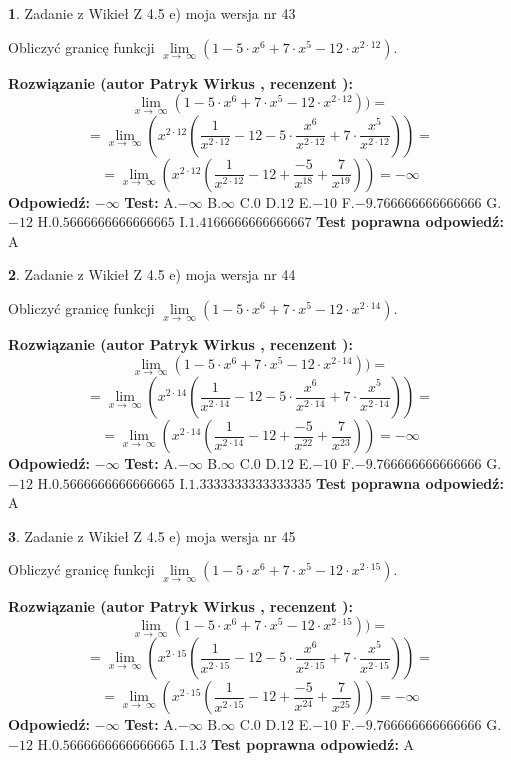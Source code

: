 \documentclass[12pt, a4paper]{article}
\theoremstyle{definition} %
\newtheorem{zad}{}
\newcommand{\zadStart}[1]{\begin{zad}#1\newline}
\newcommand{\zadStop}{\end{zad}}
\newcommand{\rozwStart}[2]{\noindent \textbf{Rozwiązanie (autor #1 , recenzent #2): }\newline}
\newcommand{\rozwStop}{\newline}
\newcommand{\odpStart}{\noindent \textbf{Odpowiedź:}\newline}
\newcommand{\odpStop}{\newline}
\newcommand{\testStart}{\noindent \textbf{Test:}\newline}
\newcommand{\testStop}{\newline}
\newcommand{\kluczStart}{\noindent \textbf{Test poprawna odpowiedź:}\newline}
\newcommand{\kluczStop}{\newline}
\begin{document}
\zadStart{Zadanie z Wikieł Z 4.5 e) moja wersja nr 43}


Obliczyć granicę funkcji  $\lim\limits_{x\to\ \infty}(1 - 5 \cdot x^{6}+7 \cdot x^{5}- 12 \cdot x^{2\cdot12})$.
\zadStop
\rozwStart{Patryk Wirkus}{}
$$\lim\limits_{x\to\ \infty}(1 - 5 \cdot x^{6}+7 \cdot x^{5}- 12 \cdot x^{2\cdot12}))=$$
$$=\lim\limits_{x\to\ \infty}(x^{2\cdot12}(\frac{1}{x^{2\cdot12}}-12 -5 \cdot \frac{x^{6}}{x^{2\cdot12}}+7 \cdot \frac{x^{5}}{x^{2\cdot12}}))=$$
$$=\lim\limits_{x\to\ \infty}(x^{2\cdot12}(\frac{1}{x^{2\cdot12}}-12 + \frac{-5}{x^{18}}+ \frac{7}{x^{19}}))=-\infty$$
\rozwStop
\odpStart
$-\infty$
\odpStop
\testStart
A.$-\infty$ B.$\infty$ C.$0$ D.$12$ E.$-10$
F.$-9.766666666666666$ G.$-12$
H.$0.5666666666666665$
I.$1.4166666666666667$
\testStop
\kluczStart
A
\kluczStop



\zadStart{Zadanie z Wikieł Z 4.5 e) moja wersja nr 44}


Obliczyć granicę funkcji  $\lim\limits_{x\to\ \infty}(1 - 5 \cdot x^{6}+7 \cdot x^{5}- 12 \cdot x^{2\cdot14})$.
\zadStop
\rozwStart{Patryk Wirkus}{}
$$\lim\limits_{x\to\ \infty}(1 - 5 \cdot x^{6}+7 \cdot x^{5}- 12 \cdot x^{2\cdot14}))=$$
$$=\lim\limits_{x\to\ \infty}(x^{2\cdot14}(\frac{1}{x^{2\cdot14}}-12 -5 \cdot \frac{x^{6}}{x^{2\cdot14}}+7 \cdot \frac{x^{5}}{x^{2\cdot14}}))=$$
$$=\lim\limits_{x\to\ \infty}(x^{2\cdot14}(\frac{1}{x^{2\cdot14}}-12 + \frac{-5}{x^{22}}+ \frac{7}{x^{23}}))=-\infty$$
\rozwStop
\odpStart
$-\infty$
\odpStop
\testStart
A.$-\infty$ B.$\infty$ C.$0$ D.$12$ E.$-10$
F.$-9.766666666666666$ G.$-12$
H.$0.5666666666666665$
I.$1.3333333333333335$
\testStop
\kluczStart
A
\kluczStop



\zadStart{Zadanie z Wikieł Z 4.5 e) moja wersja nr 45}


Obliczyć granicę funkcji  $\lim\limits_{x\to\ \infty}(1 - 5 \cdot x^{6}+7 \cdot x^{5}- 12 \cdot x^{2\cdot15})$.
\zadStop
\rozwStart{Patryk Wirkus}{}
$$\lim\limits_{x\to\ \infty}(1 - 5 \cdot x^{6}+7 \cdot x^{5}- 12 \cdot x^{2\cdot15}))=$$
$$=\lim\limits_{x\to\ \infty}(x^{2\cdot15}(\frac{1}{x^{2\cdot15}}-12 -5 \cdot \frac{x^{6}}{x^{2\cdot15}}+7 \cdot \frac{x^{5}}{x^{2\cdot15}}))=$$
$$=\lim\limits_{x\to\ \infty}(x^{2\cdot15}(\frac{1}{x^{2\cdot15}}-12 + \frac{-5}{x^{24}}+ \frac{7}{x^{25}}))=-\infty$$
\rozwStop
\odpStart
$-\infty$
\odpStop
\testStart
A.$-\infty$ B.$\infty$ C.$0$ D.$12$ E.$-10$
F.$-9.766666666666666$ G.$-12$
H.$0.5666666666666665$
I.$1.3$
\testStop
\kluczStart
A
\kluczStop
\end{document}
